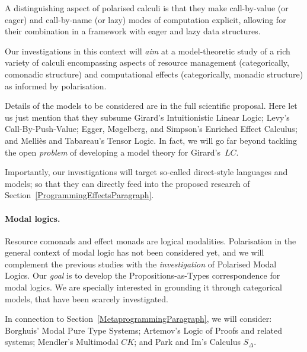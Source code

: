 \documentclass[11pt,twocolumn]{article}
\newcommand{\hl}{\emph}
\newcommand{\eg}{\emph{eg.}}
\newcommand{\LC}{\mbox{$LC$}}
\begin{document}
A distinguishing aspect of polarised calculi is that they make call-by-value
(or eager) and call-by-name (or lazy) modes of computation explicit, allowing
for their combination in a framework with eager and lazy data structures.

Our investigations in this context will \hl{aim} at a model-theoretic study of
a rich variety of calculi encompassing aspects of resource management
(categorically, comonadic structure) %
and computational effects (categorically, monadic 
structure) %
as informed by polarisation.

Details of the models to be considered are in the full scientific proposal.
Here let us just mention that they subsume 
%
Girard's Intuitionistic Linear Logic; %
%
Levy's Call-By-Push-Value; %
%
Egger, M{\o}gelberg, and Simpson's Enriched Effect Calculus; %
and
%
Melli\`es and Tabareau's Tensor Logic. %
%
In fact, we will go far beyond tackling the open \hl{problem} of developing a
model theory for Girard's~\LC.

Importantly, our investigations will target so-called direct-style languages
and models; so that they can directly feed into the proposed research of
Section~\ref{ProgrammingEffectsParagraph}.

\paragraph{Modal logics.}
\label{ModalLogicsParagraph}

Resource comonads and effect monads are logical modalities.  Polarisation in
the general context of modal logic has not been considered yet, and we will
complement the previous studies with the \hl{investigation} of Polarised
Modal Logics.  Our \hl{goal} is to develop the Propositions-as-Types
correspondence for modal logics.  We are specially interested in grounding it
through categorical models, that have been scarcely investigated.

In connection to Section~\ref{MetaprogrammingParagraph}, we will 
consider: 
%
Borghuis' Modal Pure Type Systems; %
%
Artemov's Logic of Proofs %
and related systems;
%
Mendler's Multimodal $CK$; %
and
%
Park and Im's Calculus $S_\Delta$. %
\end{document}

